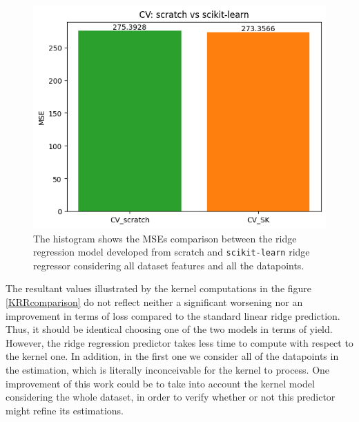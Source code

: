 \documentclass{article}
\begin{document}
    
\begin{figure}[H]
	\begin{adjustwidth}{0 cm}{}
		\begin{center}
			\includegraphics[scale= 0.53]{images/finalCV.png}
		\end{center}
	\end{adjustwidth}
	\caption{The histogram shows the MSEs comparison between the ridge regression model developed from scratch and \texttt{scikit-learn} ridge regressor considering all dataset features and all the datapoints.}
	\label{CVscrsk}
\end{figure}
The resultant values illustrated by the kernel computations in the figure \ref{KRRcomparison} do not reflect neither a significant worsening nor an improvement in terms of loss compared to the standard linear ridge prediction. Thus, it should be identical choosing one of the two models in terms of yield. However, the ridge regression predictor takes less time to compute with respect to the kernel one. In addition, in the first one we consider all of the datapoints in the estimation, which is literally inconceivable for the kernel to process. One improvement of this work could be to take into account the kernel model considering the whole dataset, in order to verify whether or not this predictor might refine its estimations. 
\end{document}
